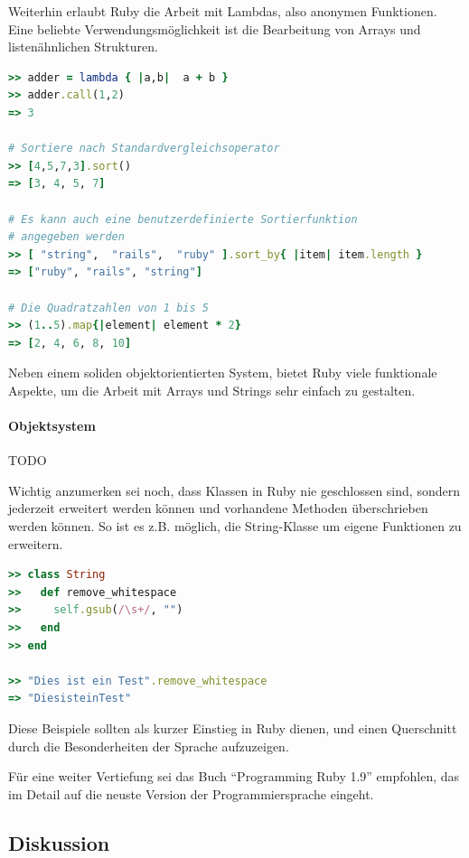 Weiterhin erlaubt Ruby die Arbeit mit Lambdas, also anonymen Funktionen. Eine beliebte Verwendungsmöglichkeit ist die Bearbeitung von Arrays und listenähnlichen Strukturen.

\begin{lstlisting}[language=Ruby,label=Ruby Beispiel: Lambdas,caption=Ruby Beispiel: Lambdas]
>> adder = lambda { |a,b|  a + b }
>> adder.call(1,2)
=> 3

# Sortiere nach Standardvergleichsoperator
>> [4,5,7,3].sort()
=> [3, 4, 5, 7]

# Es kann auch eine benutzerdefinierte Sortierfunktion
# angegeben werden
>> [ "string",  "rails",  "ruby" ].sort_by{ |item| item.length }
=> ["ruby", "rails", "string"]

# Die Quadratzahlen von 1 bis 5
>> (1..5).map{|element| element * 2}
=> [2, 4, 6, 8, 10]
\end{lstlisting}
Neben einem soliden objektorientierten System, bietet Ruby viele funktionale Aspekte, um die Arbeit mit Arrays und Strings sehr einfach zu gestalten. 

\paragraph{Objektsystem}
TODO


Wichtig anzumerken sei noch, dass Klassen in Ruby nie geschlossen sind, sondern jederzeit erweitert werden können und vorhandene Methoden überschrieben werden können. So ist es z.B. möglich, die String-Klasse um eigene Funktionen zu erweitern.

\begin{lstlisting}[language=Ruby,label=Ruby Beispiel offene Klassen,caption=Ruby Beispiel offene Klassen]
>> class String
>>   def remove_whitespace
>>     self.gsub(/\s+/, "")
>>   end
>> end

>> "Dies ist ein Test".remove_whitespace
=> "DiesisteinTest"

\end{lstlisting}

Diese Beispiele sollten als kurzer Einstieg in Ruby dienen, und einen Querschnitt durch die Besonderheiten der Sprache aufzuzeigen.

Für eine weiter Vertiefung sei das Buch "`Programming Ruby 1.9"' empfohlen, das im Detail auf die neuste Version der Programmiersprache eingeht. %

\subsection{Diskussion}

